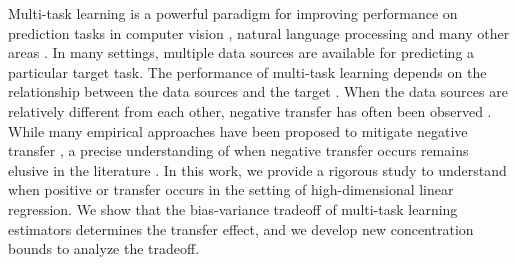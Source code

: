 Multi-task learning is a powerful paradigm for improving performance on prediction tasks in computer vision \cite{chexnet17,ZSSGM18}, natural language processing \cite{GLUE,superglue} and many other areas \cite{ZY17}.
In many settings, multiple data sources are available for predicting a particular target task.
The performance of multi-task learning depends on the relationship between the data sources and the target \cite{C97}.
When the data sources are relatively different from each other, negative transfer has often been observed \cite{PY09,AP16,BS17}.
While many empirical approaches have been proposed to mitigate negative transfer \cite{ZY17}, a precise understanding of when negative transfer occurs remains elusive in the literature \cite{R17}.
In this work, we provide a rigorous study to understand when positive or transfer occurs in the setting of high-dimensional linear regression.
We show that the bias-variance tradeoff of multi-task learning estimators determines the transfer effect, and we develop new concentration bounds to analyze the tradeoff.


